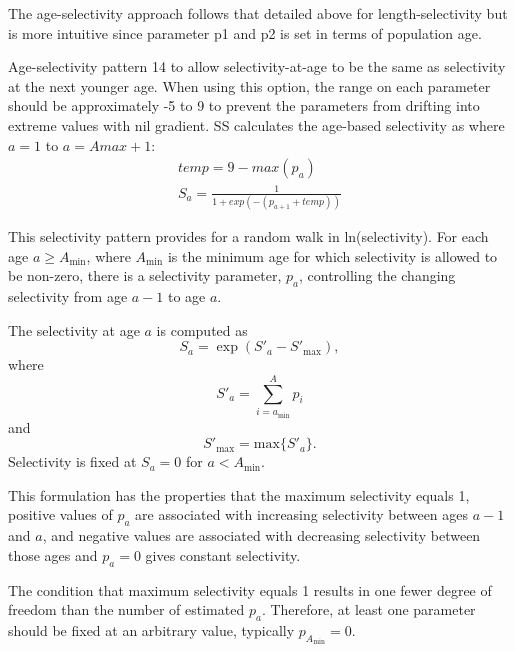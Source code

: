 The age-selectivity approach follows that detailed above for length-selectivity but is more intuitive since parameter p1 and p2 is set in terms of population age. 

Age-selectivity pattern 14 to allow selectivity-at-age to be the same as selectivity at the next younger age.  When using this option, the range on each parameter should be approximately -5 to 9 to prevent the parameters from drifting into extreme values with nil gradient. SS calculates the age-based selectivity as where $a = 1$ to $a = Amax + 1$:
	\begin{equation}
		 \begin{split}
		 temp = 9 - max(p_a)\\
		S_a = \frac{1}{1+exp(-(p_{a+1} + temp))}
		\end{split}
	\end{equation}	

This selectivity pattern provides for a random walk in ln(selectivity).  For each age $a \geq A_{\text{min}}$, where $A_{\text{min}}$ is the minimum age for which selectivity is allowed to be non-zero, there is a selectivity parameter, $p_a$, controlling the changing selectivity from age $a-1$ to age $a$.
	
The selectivity at age $a$ is computed as
	\begin{equation}
	S_a = \exp (S'_a - S'_{\text{max}}),
	\end{equation}
where
	\begin{equation}
	S'_a = \sum_{i = a_{\text{min}}}^A p_i
	\end{equation}
and 
	\begin{equation}
	S'_{\text{max}} = \mbox{max} \{S'_a\}.
	\end{equation}
Selectivity is fixed at $S_a = 0$ for $a < A_{\text{min}}$. 
	
This formulation has the properties that the maximum selectivity equals 1, positive values of $p_a$ are associated with increasing selectivity between ages $a-1$ and $a$, and negative values are associated with decreasing selectivity between those ages and $p_a = 0$ gives constant selectivity.
	
The condition that maximum selectivity equals 1 results in one fewer degree of freedom than the number of estimated $p_a$. Therefore, at least one parameter should be fixed at an arbitrary value, typically $p_{A_{\text{min}}}=0$.
	
